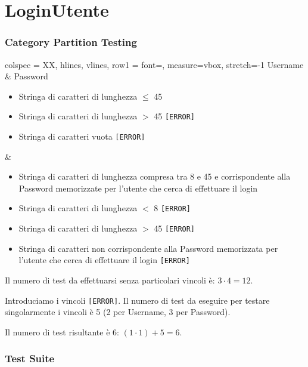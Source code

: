 \section{LoginUtente}

\subsubsection*{Category Partition Testing}

\begin{table}[!hbp]
	\centering
	\footnotesize
	\begin{tblr}{
		colspec = XX,
		hlines, vlines,
		row{1} = {font=\bfseries},
		measure=vbox, stretch=-1
		}
		Username & Password \\
		\begin{itemize}[leftmargin=*]
			\item Stringa di caratteri di lunghezza $\leq$ 45
			\item Stringa di caratteri di lunghezza $>$ 45 \texttt{[ERROR]}
			\item Stringa di caratteri vuota \texttt{[ERROR]}
		\end{itemize} &
		\begin{itemize}[leftmargin=*]
			\item Stringa di caratteri di lunghezza compresa tra 8 e 45 e corrispondente alla Password memorizzate per l'utente che cerca di effettuare il login
			\item Stringa di caratteri di lunghezza $<$ 8 \texttt{[ERROR]}
			\item Stringa di caratteri di lunghezza $>$ 45 \texttt{[ERROR]}
			\item Stringa di caratteri non corrispondente alla Password memorizzata per l'utente che cerca di effettuare il login \texttt{[ERROR]}
		\end{itemize}
	\end{tblr}
\end{table}

\noindent Il numero di test da effettuarsi senza particolari vincoli è: $3 \cdot 4 = 12$.

\noindent Introduciamo i vincoli \texttt{[ERROR]}. Il numero di test da eseguire per testare singolarmente i vincoli è 5 (2 per Username, 3 per Password).

\noindent Il numero di test risultante è 6: $(1 \cdot 1) + 5 = 6$.

\subsubsection*{Test Suite}

